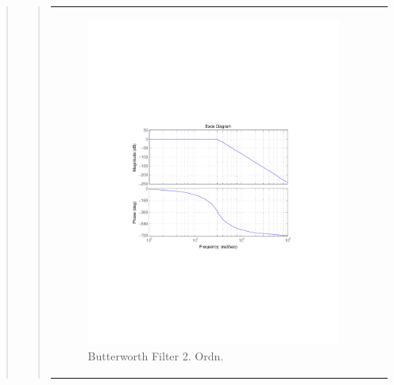 \begin{quote}
\begin{quote}
\begin{tabular}{ll}
\begin{minipage}{0.6\textwidth}
                \begin{figure}[H]
                    \label{fig:butter_2} 
                    \includegraphics[scale=0.7, trim = 3.5cm 7cm 3.5cm 7cm, clip]{Bilder/butter_8} %
                    \caption{Butterworth Filter 2. Ordn.}
                \end{figure}

            \end{minipage}
        

\end{tabular}
\end{quote}
\end{quote}
